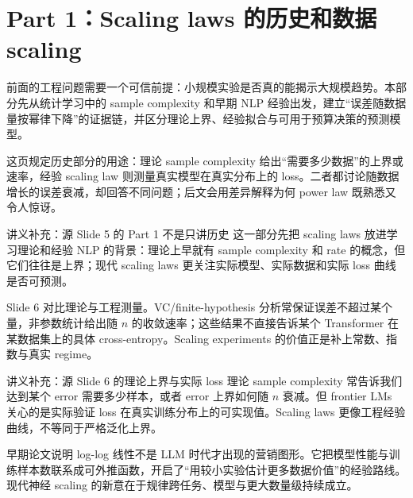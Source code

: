 \section{Part 1：Scaling laws 的历史和数据 scaling}

前面的工程问题需要一个可信前提：小规模实验是否真的能揭示大规模趋势。本部分先从统计学习中的 sample complexity 和早期 NLP 经验出发，建立“误差随数据量按幂律下降”的证据链，并区分理论上界、经验拟合与可用于预算决策的预测模型。



这页规定历史部分的用途：理论 sample complexity 给出“需要多少数据”的上界或速率，经验 scaling law 则测量真实模型在真实分布上的 loss。二者都讨论随数据增长的误差衰减，却回答不同问题；后文会用差异解释为何 power law 既熟悉又令人惊讶。

\begin{knowledgebox}{讲义补充：源 Slide 5 的 Part 1 不是只讲历史}
这一部分先把 scaling laws 放进学习理论和经验 NLP 的背景：理论上早就有 sample complexity 和 rate 的概念，但它们往往是上界；现代 scaling laws 更关注实际模型、实际数据和实际 loss 曲线是否可预测。
\end{knowledgebox}



Slide 6 对比理论与工程测量。VC/finite-hypothesis 分析常保证误差不超过某个量，非参数统计给出随 $n$ 的收敛速率；这些结果不直接告诉某个 Transformer 在某数据集上的具体 cross-entropy。Scaling experiments 的价值正是补上常数、指数与真实 regime。

\begin{knowledgebox}{讲义补充：源 Slide 6 的理论上界与实际 loss}
理论 sample complexity 常告诉我们达到某个 error 需要多少样本，或者 error 上界如何随 \(n\) 衰减。但 frontier LMs 关心的是实际验证 loss 在真实训练分布上的可实现值。Scaling laws 更像工程经验曲线，不等同于严格泛化上界。
\end{knowledgebox}



早期论文说明 log-log 线性不是 LLM 时代才出现的营销图形。它把模型性能与训练样本数联系成可外推函数，开启了“用较小实验估计更多数据价值”的经验路线。现代神经 scaling 的新意在于规律跨任务、模型与更大数量级持续成立。

